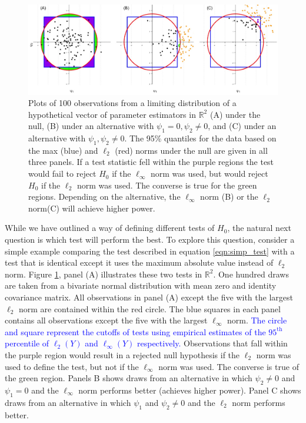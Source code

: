 \documentclass{article}
\newcommand{\rvt}{Y}
\begin{document}
\begin{figure}
	\centering
	\includegraphics[width = \linewidth]{figure_code/pwr_cmp.jpeg}
	\caption{Plots of 100 observations from a limiting distribution of a hypothetical vector of parameter estimators in $\mathbb{R}^2$ (A) under the null, (B) under an alternative with $\psi_1 = 0, \psi_2 \neq 0$, and (C) under an alternative with $\psi_1, \psi_2 \neq 0$. The 95\% quantiles for the data based on the max (blue) and $\ell_2$ (red) norms under the null are given in all three panels. If a test statistic fell within the purple regions the test would fail to reject $H_0$ if the $\ell_\infty$ norm was used, but would reject $H_0$ if the $\ell_2$ norm was used.  The converse is true for the green regions.  Depending on the alternative, the $\ell_\infty$ norm (B) or the $\ell_2$ norm(C) will achieve higher power.}
	\label{fig:figure1}
\end{figure}

While we have outlined a way of defining different tests of $H_0$, the natural next question is which test will perform the best.  To explore this question, consider a simple example comparing the test described in equation \eqref{eqn:simp_test} with a test that is identical except it uses the maximum absolute value instead of $\ell_2$ norm.  Figure \ref{fig:figure1}, panel (A) illustrates these two tests in $\mathbb{R}^2$. One hundred draws are taken from a bivariate normal distribution with mean zero and identity covariance matrix. All observations in panel (A) except the five with the largest $\ell_2$ norm are contained within the red circle. The blue squares in each panel contains all observations except the five with the largest $\ell_\infty$ norm. 
\textcolor{blue}{The circle and square represent the cutoffs of tests using empirical estimates of the $95^{\text{th}}$ percentile of $\ell_2(\rvt)$ and $\ell_\infty(\rvt)$ respectively.}
Observations that fall within the purple region would result in a rejected null hypothesis if the $\ell_2$ norm was used to define the test, but not if the $\ell_\infty$ norm was used. The converse is true of the green region. Panels B shows draws from an alternative in which $\psi_2 \ne 0$ and $\psi_1 = 0$ and the $\ell_\infty$ norm performs better (achieves higher power). Panel C shows draws from an alternative in which $\psi_1$ and $\psi_2 \neq 0$ and the $\ell_2$ norm performs better. 
\end{document}
